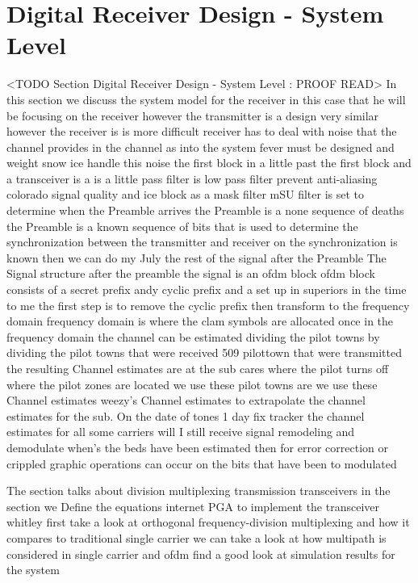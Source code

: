 \section{Digital Receiver Design - System Level}
	<TODO Section Digital Receiver Design - System Level : PROOF READ>
In this section we discuss the system model for the receiver in this case that he will be focusing on the receiver however the transmitter is a design very similar however the receiver is is more difficult receiver has to deal with noise that the channel provides in the channel as into the system fever must be designed and weight snow ice handle this noise the first block in a little past the first block and a transceiver is a is a little pass filter is low pass filter prevent anti-aliasing colorado signal quality and ice block as a mask filter mSU filter is set to determine when the Preamble arrives the Preamble is a none sequence of deaths the Preamble is a known sequence of bits that is used to determine the synchronization between the transmitter and receiver on the synchronization is known then we can do my July the rest of the signal after the Preamble The Signal structure after the preamble the signal is an ofdm block ofdm block consists of a secret prefix andy cyclic prefix and a set up in superiors in the time to me the first step is to remove the cyclic prefix then transform to the frequency domain frequency domain is where the clam symbols are allocated once in the frequency domain the channel can be estimated dividing the pilot towns by dividing the pilot towns that were received 509 pilottown that were transmitted the resulting Channel estimates are at the sub cares where the pilot turns off where the pilot zones are located we use these pilot towns are we use these Channel estimates weezy's Channel estimates to extrapolate the channel estimates for the sub. On the date of tones 1 day fix tracker the channel estimates for all some carriers will I still receive signal remodeling and demodulate when's the beds have been estimated then for error correction or crippled graphic operations can occur on the bits that have been to modulated

The section talks about division multiplexing transmission transceivers in the section we Define the equations internet PGA to implement the transceiver whitley first take a look at orthogonal frequency-division multiplexing and how it compares to traditional single carrier we can take a look at how multipath is considered in single carrier and ofdm find a good look at simulation results for the system

